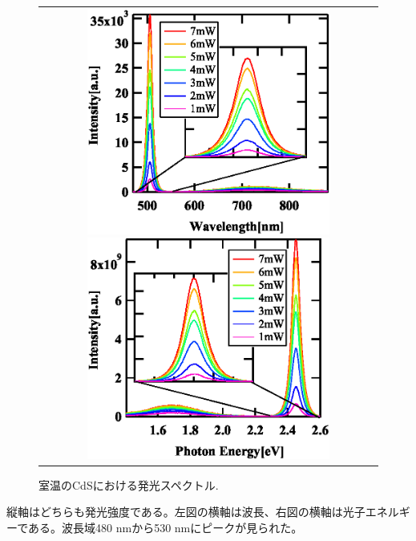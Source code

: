 \documentclass[11pt,a4j]{jsarticle}
\begin{document}
\begin{figure}[ht]
 \centering
 \begin{tabular}{c}

  \begin{minipage}{0.5\hsize}

   \includegraphics[clip,width=8cm]{start2_CdS_rt_Spectrum_wav.eps}
  \end{minipage}

  \begin{minipage}{0.06\hsize}%
   \hspace{5mm}
  \end{minipage}

  \begin{minipage}{0.5\hsize}
   \centering
   \includegraphics[clip,width=8cm]{start2_CdS_rt_Spectrum_eV.eps}
  \end{minipage}
 \end{tabular}
 \caption{室温のCdSにおける発光スペクトル.}
 \label{fig_cds_rt_spec1}

\end{figure}

縦軸はどちらも発光強度である。左図の横軸は波長、右図の横軸は光子エネルギーである。波長域480 nmから530 nmにピークが見られた。
%
\end{document}
